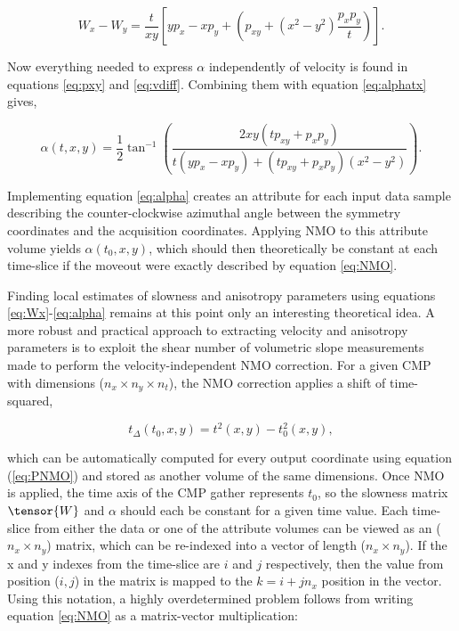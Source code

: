 \begin{equation}
\label{eq:vdiff}
W_x-W_y=\frac{t}{xy}[yp_x-xp_y+(p_{xy}+(x^2-y^2)\frac{p_xp_y}{t})].
\end{equation}

\noindent Now everything needed to express $\alpha $ independently of velocity is found in equations \ref{eq:pxy} and \ref{eq:vdiff}.  Combining them with equation \ref{eq:alphatx} gives,

\begin{equation}
\label{eq:alpha}
\alpha(t,x,y)=\frac{1}{2}\tan ^{-1}\left(\frac{2xy(tp_{xy}+p_xp_y)}{t(yp_x-xp_y)+(tp_{xy}+p_xp_y)(x^2-y^2)}\right).
\end{equation}

\noindent Implementing equation \ref{eq:alpha} creates an attribute for each input data sample describing the counter-clockwise azimuthal angle between the symmetry coordinates and the acquisition coordinates.  Applying NMO to this attribute volume yields $\alpha (t_0,x,y)$, which should then theoretically be constant at each time-slice if the moveout were exactly described by equation \ref{eq:NMO}.

Finding local estimates of slowness and anisotropy parameters using equations \ref{eq:Wx}-\ref{eq:alpha} remains at this point only an interesting theoretical idea.  A more robust and practical approach to extracting velocity and anisotropy parameters is to exploit the shear number of volumetric slope measurements made to perform the velocity-independent NMO correction.  For a given CMP with dimensions ($n_x\times n_y\times n_t$), the NMO correction applies a shift of time-squared, 


\begin{equation}
\label{eq:dt}
t_\Delta (t_0,x,y) =t^2(x,y)-t_0^2(x,y),
\end{equation}

\noindent which can be automatically computed for every output coordinate using equation (\ref{eq:PNMO}) and stored as another volume of the same dimensions.  Once NMO is applied, the time axis of the CMP gather represents $t_0$, so the slowness matrix $\tensor{W}$ and $\alpha $ should each be constant for a given time value.  Each time-slice from either the data or one of the attribute volumes can be viewed as an ($n_x \times n_y$) matrix, which can be re-indexed into a vector of length ($n_x \times n_y$).  If the x and y indexes from the time-slice are $i$ and $j$ respectively, then the value from position ($i,j$) in the matrix is mapped to the $k=i+jn_x$ position in the vector.  Using this notation, a highly overdetermined problem follows from writing equation \ref{eq:NMO} as a matrix-vector multiplication:


